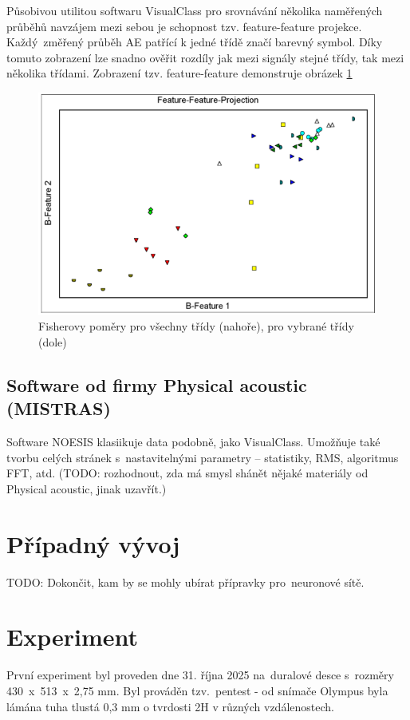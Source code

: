 Působivou utilitou softwaru VisualClass pro srovnávání
několika naměřených průběhů navzájem mezi sebou je 
schopnost tzv. feature-feature projekce.
Každý~změřený průběh AE patřící k jedné třídě 
značí barevný symbol. Díky tomuto zobrazení lze 
snadno ověřit rozdíly jak mezi signály stejné třídy, 
tak mezi několika třídami. Zobrazení tzv. feature-feature demonstruje 
obrázek \ref{fig:vallen_feature_feature}
\begin{figure}[!ht]
    \centering
    \includegraphics[width=0.75\linewidth]{obrazky/visual_class_feature_feature.png}
    \caption{Fisherovy poměry pro všechny třídy (nahoře), pro vybrané třídy (dole) \cite{vallen_visual_class}}
    \label{fig:vallen_feature_feature}
\end{figure}
\subsection{Software od firmy Physical acoustic (MISTRAS)}
Software NOESIS klasiikuje data podobně, 
jako VisualClass. Umožňuje také tvorbu celých stránek 
s~nastavitelnými parametry – statistiky, 
RMS, algoritmus FFT, atd. (TODO: rozhodnout,
zda má smysl shánět nějaké materiály od Physical acoustic,
 jinak uzavřít.)
\section{Případný vývoj}
TODO: Dokončit, kam by se mohly ubírat přípravky pro~neuronové sítě.
\section{Experiment}
První experiment byl 
proveden dne 31. října 2025 na~duralové
desce s~rozměry 430~x~513~x~2,75 mm. Byl prováděn 
tzv.~pentest - od snímače Olympus byla lámána tuha
tlustá 0,3 mm o tvrdosti 2H v různých vzdálenostech.






